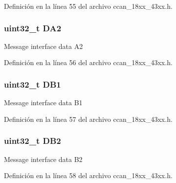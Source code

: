 Definición en la línea 55 del archivo ccan\+\_\+18xx\+\_\+43xx.\+h.

\subsubsection[{\texorpdfstring{D\+A2}{DA2}}]{ uint32\+\_\+t D\+A2}\hypertarget{struct_c_c_a_n___i_f___t_aa172382232cd70b775b43668705bbd30}{}\label{struct_c_c_a_n___i_f___t_aa172382232cd70b775b43668705bbd30}
Message interface data A2 

Definición en la línea 56 del archivo ccan\+\_\+18xx\+\_\+43xx.\+h.

\subsubsection[{\texorpdfstring{D\+B1}{DB1}}]{ uint32\+\_\+t D\+B1}\hypertarget{struct_c_c_a_n___i_f___t_a0391f1b2bda043bfe608120be60db4c8}{}\label{struct_c_c_a_n___i_f___t_a0391f1b2bda043bfe608120be60db4c8}
Message interface data B1 

Definición en la línea 57 del archivo ccan\+\_\+18xx\+\_\+43xx.\+h.

\subsubsection[{\texorpdfstring{D\+B2}{DB2}}]{ uint32\+\_\+t D\+B2}\hypertarget{struct_c_c_a_n___i_f___t_a1579d8f76b3f0add6ac7f9af6bb672da}{}\label{struct_c_c_a_n___i_f___t_a1579d8f76b3f0add6ac7f9af6bb672da}
Message interface data B2 

Definición en la línea 58 del archivo ccan\+\_\+18xx\+\_\+43xx.\+h.

